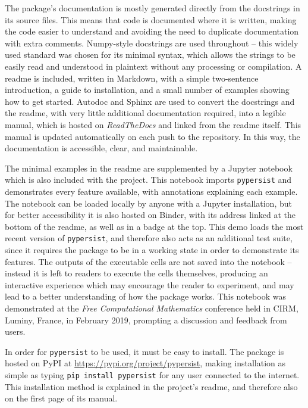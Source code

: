 \documentclass{deliverablereport}
\newcommand{\pypersist}{\texttt{pypersist}}
\begin{document}
The package's documentation is mostly generated directly from the docstrings in
its source files.  This means that code is documented where it is written,
making the code easier to understand and avoiding the need to duplicate
documentation with extra comments.  Numpy-style docstrings are used throughout
-- this widely used standard was chosen for its minimal syntax, which allows the
strings to be easily read and understood in plaintext without any processing or
compilation.  A readme is included, written in Markdown, with a simple
two-sentence introduction, a guide to installation, and a small number of examples
showing how to get started.  Autodoc and Sphinx are used to convert the
docstrings and the readme, with very little additional documentation required,
into a legible manual, which is hosted on \textit{ReadTheDocs} and linked from
the readme itself.  This manual is updated automatically on each push to the
repository.  In this way, the documentation is accessible, clear, and
maintainable.

The minimal examples in the readme are supplemented by a Jupyter notebook which
is also included with the project.  This notebook imports \pypersist{} and
demonstrates every feature available, with annotations explaining each example.
The notebook can be loaded locally by anyone with a Jupyter installation, but
for better accessibility it is also hosted on Binder, with its address linked at
the bottom of the readme, as well as in a badge at the top.  This demo loads the
most recent version of \pypersist{}, and therefore also acts as an additional
test suite, since it requires the package to be in a working state in order to
demonstrate its features.  The outputs of the executable cells are not saved
into the notebook -- instead it is left to readers to execute the cells
themselves, producing an interactive experience which may encourage the reader to
experiment, and may lead to a better understanding of how the package works.
This notebook was demonstrated at the \emph{Free Computational Mathematics}
conference held in CIRM, Luminy, France, in February 2019, prompting a
discussion and feedback from users.

In order for \pypersist{} to be used, it must be easy to install.  The package
is hosted on PyPI at \url{https://pypi.org/project/pypersist}, making
installation as simple as typing \texttt{pip install pypersist} for any user
connected to the internet.  This installation method is explained in the
project's readme, and therefore also on the first page of its manual.
\end{document}
